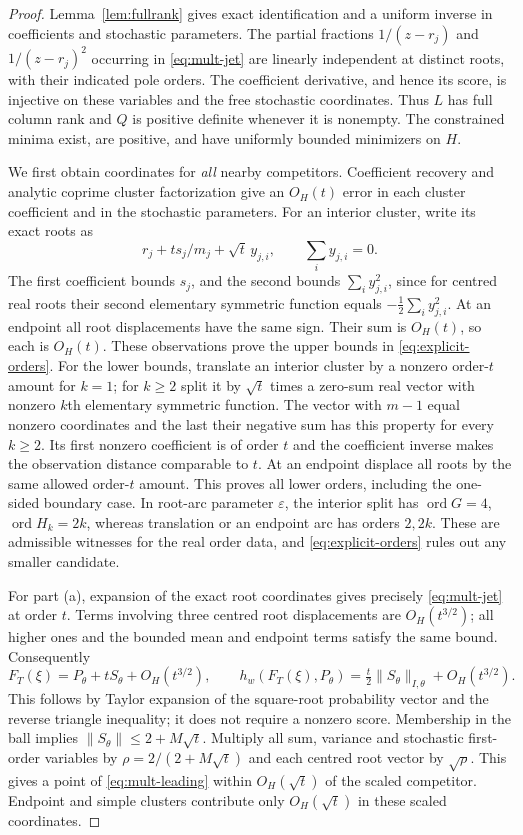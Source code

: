\begin{proof}
Lemma~\ref{lem:fullrank} gives exact identification and a uniform inverse
in coefficients and stochastic parameters. The partial fractions
$1/(z-r_j)$ and $1/(z-r_j)^2$ occurring in \eqref{eq:mult-jet} are
linearly independent at distinct roots, with their indicated pole
orders. The coefficient derivative, and hence its score, is injective
on these variables and the free stochastic coordinates. Thus $L$ has
full column rank and $Q$ is positive definite whenever it is nonempty.
The constrained minima exist, are positive, and have uniformly bounded
minimizers on $H$.

We first obtain coordinates for \emph{all} nearby competitors. Coefficient
recovery and analytic coprime cluster factorization give an $O_H(t)$
error in each cluster coefficient and in the stochastic parameters.
For an interior cluster, write its exact roots as
\[
 r_j+t s_j/m_j+\sqrt t\,y_{j,i},\qquad \sum_i y_{j,i}=0.
\]
The first coefficient bounds $s_j$, and the second bounds
$\sum_i y_{j,i}^2$, since for centred real roots their second elementary
symmetric function equals $-\tfrac12\sum_i y_{j,i}^2$. At an endpoint
all root displacements have the same sign. Their sum is $O_H(t)$,
so each is $O_H(t)$. These observations prove the upper bounds in
\eqref{eq:explicit-orders}. For the lower bounds, translate an interior
cluster by a nonzero order-$t$ amount for $k=1$; for $k\ge2$ split it
by $\sqrt t$ times a zero-sum real vector with nonzero $k$th elementary
symmetric function. The vector with $m-1$ equal nonzero coordinates
and the last their negative sum has this property for every $k\ge2$.
Its first nonzero coefficient is of order $t$ and the coefficient
inverse makes the observation distance comparable to $t$. At an
endpoint displace all roots by the same allowed order-$t$ amount.
This proves all lower orders, including the one-sided boundary case.
In root-arc parameter $\varepsilon$, the interior split has
$\operatorname{ord}G=4$, $\operatorname{ord}H_k=2k$, whereas translation
or an endpoint arc has orders $2,2k$. These are admissible witnesses
for the real order data, and \eqref{eq:explicit-orders} rules out any
smaller candidate.

For part (a), expansion of the exact root coordinates gives precisely
\eqref{eq:mult-jet} at order $t$. Terms involving three centred root
displacements are $O_H(t^{3/2})$; all higher ones and the bounded mean
and endpoint terms satisfy the same bound. Consequently
\begin{equation}\label{eq:mult-expand}
 F_T(\xi)=P_\theta+tS_\theta+O_H(t^{3/2}),\qquad
 h_w(F_T(\xi),P_\theta)=\tfrac t2\|S_\theta\|_{I,\theta}
                          +O_H(t^{3/2}).
\end{equation}
This follows by Taylor expansion of the square-root probability vector
and the reverse triangle inequality; it does not require a nonzero score.
Membership in the ball implies $\|S_\theta\|\le2+M\sqrt t$.
Multiply all sum, variance and stochastic first-order variables by
$\rho=2/(2+M\sqrt t)$ and each centred root vector by $\sqrt\rho$.
This gives a point of \eqref{eq:mult-leading} within $O_H(\sqrt t)$ of
the scaled competitor. Endpoint and simple clusters contribute only
$O_H(\sqrt t)$ in these scaled coordinates.


\end{proof}
